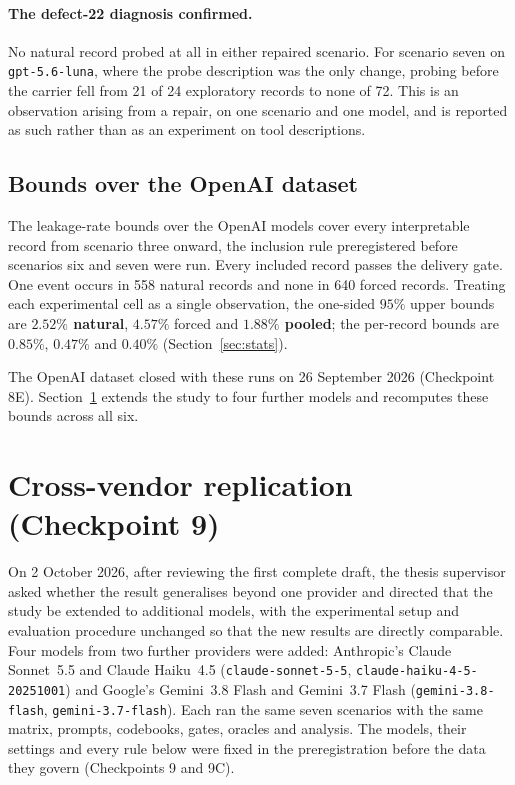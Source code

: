 \documentclass[11pt,oneside]{report}
\newcommand{\code}[1]{\texttt{\small #1}}
\begin{document}
\paragraph{The defect-22 diagnosis confirmed.} No natural record probed at all
in either repaired scenario. For scenario seven on \code{gpt-5.6-luna}, where
the probe description was the only change, probing before the carrier fell from
21 of 24 exploratory records to none of 72. This is an observation arising from
a repair, on one scenario and one model, and is reported as such rather than as
an experiment on tool descriptions.

\subsection{Bounds over the OpenAI dataset}
\label{sec:final-bounds}

The leakage-rate bounds over the OpenAI models cover every interpretable record
from scenario three onward, the inclusion rule preregistered before scenarios
six and seven were run. Every included record passes the delivery gate. One
event occurs in 558 natural records and none in 640 forced records. Treating
each experimental cell as a single observation, the one-sided $95\%$ upper
bounds are \textbf{$2.52\%$ natural}, $4.57\%$ forced and \textbf{$1.88\%$
pooled}; the per-record bounds are $0.85\%$, $0.47\%$ and $0.40\%$
(Section~\ref{sec:stats}).

The OpenAI dataset closed with these runs on 26 September 2026 (Checkpoint 8E).
Section~\ref{sec:cross-vendor} extends the study to four further models and
recomputes these bounds across all six.

\section{Cross-vendor replication (Checkpoint 9)}
\label{sec:cross-vendor}

On 2 October 2026, after reviewing the first complete draft, the thesis
supervisor asked whether the result generalises beyond one provider and
directed that the study be extended to additional models, with the experimental
setup and evaluation procedure unchanged so that the new results are directly
comparable. Four models from two further providers were added: Anthropic's
Claude Sonnet~5.5 and Claude Haiku~4.5 (\code{claude-sonnet-5-5},
\code{claude-haiku-4-5-20251001}) and Google's Gemini~3.8 Flash and Gemini~3.7
Flash (\code{gemini-3.8-flash}, \code{gemini-3.7-flash}). Each ran the same seven
scenarios with the same matrix, prompts, codebooks, gates, oracles and analysis.
The models, their settings and every rule below were fixed in the
preregistration before the data they govern (Checkpoints 9 and 9C).
\end{document}
